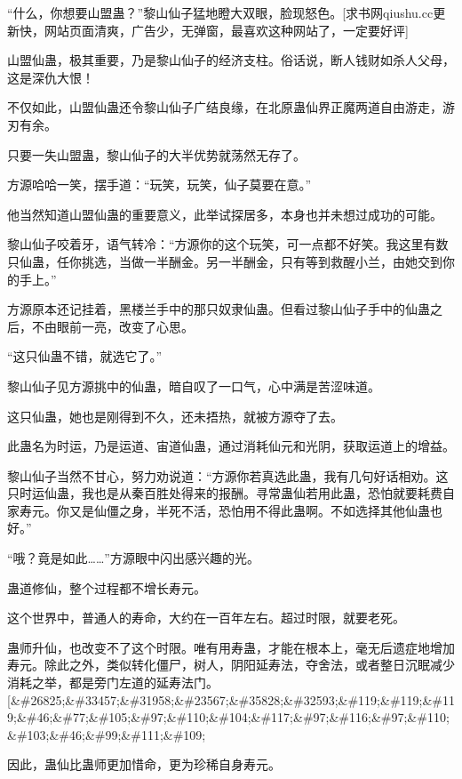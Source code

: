 
\begin{this_body}

“什么，你想要山盟蛊？”黎山仙子猛地瞪大双眼，脸现怒色。[求书网qiushu.cc更新快，网站页面清爽，广告少，无弹窗，最喜欢这种网站了，一定要好评]

山盟仙蛊，极其重要，乃是黎山仙子的经济支柱。俗话说，断人钱财如杀人父母，这是深仇大恨！

不仅如此，山盟仙蛊还令黎山仙子广结良缘，在北原蛊仙界正魔两道自由游走，游刃有余。

只要一失山盟蛊，黎山仙子的大半优势就荡然无存了。

方源哈哈一笑，摆手道：“玩笑，玩笑，仙子莫要在意。”

他当然知道山盟仙蛊的重要意义，此举试探居多，本身也并未想过成功的可能。

黎山仙子咬着牙，语气转冷：“方源你的这个玩笑，可一点都不好笑。我这里有数只仙蛊，任你挑选，当做一半酬金。另一半酬金，只有等到救醒小兰，由她交到你的手上。”

方源原本还记挂着，黑楼兰手中的那只奴隶仙蛊。但看过黎山仙子手中的仙蛊之后，不由眼前一亮，改变了心思。

“这只仙蛊不错，就选它了。”

黎山仙子见方源挑中的仙蛊，暗自叹了一口气，心中满是苦涩味道。

这只仙蛊，她也是刚得到不久，还未捂热，就被方源夺了去。

此蛊名为时运，乃是运道、宙道仙蛊，通过消耗仙元和光阴，获取运道上的增益。

黎山仙子当然不甘心，努力劝说道：“方源你若真选此蛊，我有几句好话相劝。这只时运仙蛊，我也是从秦百胜处得来的报酬。寻常蛊仙若用此蛊，恐怕就要耗费自家寿元。你又是仙僵之身，半死不活，恐怕用不得此蛊啊。不如选择其他仙蛊也好。”

“哦？竟是如此……”方源眼中闪出感兴趣的光。

蛊道修仙，整个过程都不增长寿元。

这个世界中，普通人的寿命，大约在一百年左右。超过时限，就要老死。

蛊师升仙，也改变不了这个时限。唯有用寿蛊，才能在根本上，毫无后遗症地增加寿元。除此之外，类似转化僵尸，树人，阴阳延寿法，夺舍法，或者整日沉眠减少消耗之举，都是旁门左道的延寿法门。[\&\#26825;\&\#33457;\&\#31958;\&\#23567;\&\#35828;\&\#32593;\&\#119;\&\#119;\&\#119;\&\#46;\&\#77;\&\#105;\&\#97;\&\#110;\&\#104;\&\#117;\&\#97;\&\#116;\&\#97;\&\#110;\&\#103;\&\#46;\&\#99;\&\#111;\&\#109;

因此，蛊仙比蛊师更加惜命，更为珍稀自身寿元。


\end{this_body}
